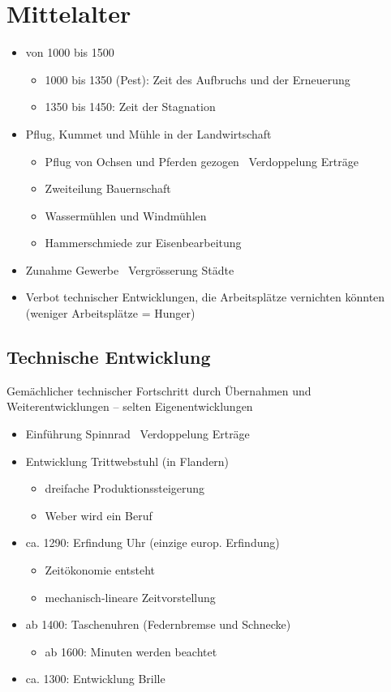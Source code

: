 \documentclass{report}
\begin{document}
\section{Mittelalter}
\begin{itemize}
	\item von 1000 bis 1500
		\begin{itemize}
			\item 1000 bis 1350 (Pest): Zeit des Aufbruchs und der Erneuerung
			\item 1350 bis 1450: Zeit der Stagnation
		\end{itemize}
	\item Pflug, Kummet und Mühle in der Landwirtschaft
		\begin{itemize}
			\item Pflug von Ochsen und Pferden gezogen \arrow~Verdoppelung Erträge
			\item Zweiteilung Bauernschaft
			\item Wassermühlen und Windmühlen
			\item Hammerschmiede zur Eisenbearbeitung
		\end{itemize}
	\item Zunahme Gewerbe \arrow~Vergrösserung Städte
	\item Verbot technischer Entwicklungen, die Arbeitsplätze vernichten könnten\\(weniger Arbeitsplätze = Hunger)
\end{itemize}

\subsection{Technische Entwicklung}
Gemächlicher technischer Fortschritt durch Übernahmen und Weiterentwicklungen – selten Eigenentwicklungen
\begin{itemize}
	\item Einführung Spinnrad \arrow~Verdoppelung Erträge
	\item Entwicklung Trittwebstuhl (in Flandern)
		\begin{itemize}
			\item dreifache Produktionssteigerung 
			\item Weber wird ein Beruf
		\end{itemize}
	\item ca. 1290: Erfindung Uhr (einzige europ. Erfindung)
		\begin{itemize}
			\item Zeitökonomie entsteht
			\item mechanisch-lineare Zeitvorstellung
		\end{itemize}
	\item ab 1400: Taschenuhren (Federnbremse und Schnecke)
		\begin{itemize}
			\item ab 1600: Minuten werden beachtet
		\end{itemize}
	\item ca. 1300: Entwicklung Brille
\end{itemize}
\end{document}
